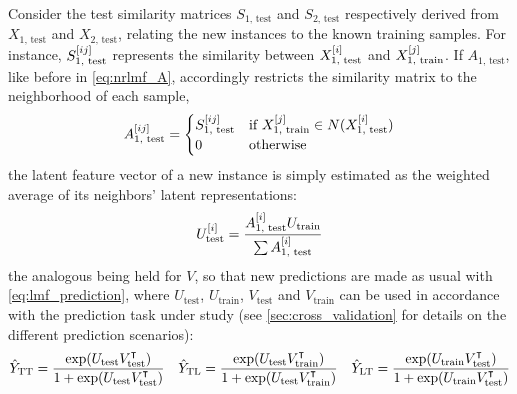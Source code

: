 \begin{apendicesenv}
Consider the test similarity matrices $S_{1\text{, test}}$ and $S_{2\text{, test}}$ respectively derived from $X_\text{1, test}$ and $X_\text{2, test}$, relating the new instances to the known training samples. For instance, $S_{1\text{, test}}^{[ij]}$ represents the similarity between $X_\text{1, test}^{[i]}$ and $X_\text{1, train}^{[j]}$. If $A_\text{1, test}$, like before in \autoref{eq:nrlmf_A}, accordingly restricts the similarity matrix to the neighborhood of each sample,
%
\begin{equation}
    A_\text{1, test}^{[ij]} =
    \begin{cases}
        S_\text{1, test}^{[ij]} & \text{if } X_\text{1, train}^{[j]} \in N(X_\text{1, test}^{[i]})\\
        0 & \text{otherwise}
    \end{cases}
    \label{eq:nrlmf_A_test}
\end{equation}
%
the latent feature vector of a new instance is simply estimated as the weighted average of its neighbors' latent representations:
%
\begin{equation}
    U_\text{test}^{[i]} = \frac{A_\text{1, test}^{[i]} U_\text{train}}{\sum A_\text{1, test}^{[i]}}
\end{equation}
%
the analogous being held for $V$, so that new predictions are made as usual with \autoref{eq:lmf_prediction}, where $U_\text{test}$, $U_\text{train}$, $V_\text{test}$ and $V_\text{train}$ can be used in accordance with the prediction task under study (see \autoref{sec:cross_validation} for details on the different prediction scenarios):
%
\begin{gather}
    \begin{aligned}
        \hat Y_\text{TT} = \frac{\exp(U_\text{test} V_\text{test}^\intercal)}{1 + \exp(U_\text{test} V_\text{test}^\intercal)}&&
        \hat Y_\text{TL} = \frac{\exp(U_\text{test} V_\text{train}^\intercal)}{1 + \exp(U_\text{test} V_\text{train}^\intercal)}&&
        \hat Y_\text{LT} = \frac{\exp(U_\text{train} V_\text{test}^\intercal)}{1 + \exp(U_\text{train} V_\text{test}^\intercal)}
    \end{aligned}
\end{gather}





\end{apendicesenv}
